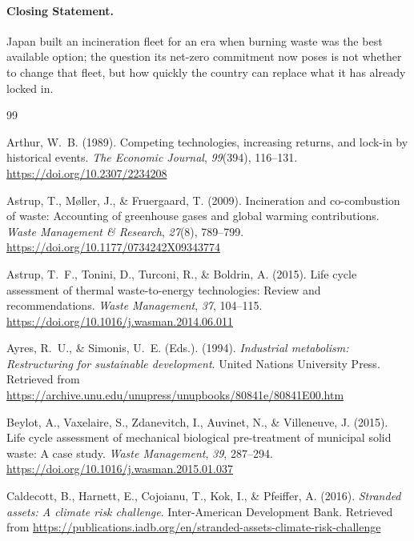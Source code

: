 \documentclass[12pt,a4paper]{article}
\begin{document}
\paragraph*{Closing Statement.}
Japan built an incineration fleet for an era when burning waste was the best available option; the question its net-zero commitment now poses is not whether to change that fleet, but how quickly the country can replace what it has already locked in.


\clearpage

\begin{thebibliography}{99}

Arthur, W.~B. (1989).
Competing technologies, increasing returns, and lock-in by historical events.
\emph{The Economic Journal}, \emph{99}(394), 116--131.
\url{https://doi.org/10.2307/2234208}

Astrup, T., M{\o}ller, J., \& Fruergaard, T. (2009).
Incineration and co-combustion of waste: Accounting of greenhouse gases and global warming contributions.
\emph{Waste Management \& Research}, \emph{27}(8), 789--799.
\url{https://doi.org/10.1177/0734242X09343774}

Astrup, T.~F., Tonini, D., Turconi, R., \& Boldrin, A. (2015).
Life cycle assessment of thermal waste-to-energy technologies: Review and recommendations.
\emph{Waste Management}, \emph{37}, 104--115.
\url{https://doi.org/10.1016/j.wasman.2014.06.011}

Ayres, R.~U., \& Simonis, U.~E. (Eds.). (1994).
\emph{Industrial metabolism: Restructuring for sustainable development}.
United Nations University Press.
Retrieved from \url{https://archive.unu.edu/unupress/unupbooks/80841e/80841E00.htm}

Beylot, A., Vaxelaire, S., Zdanevitch, I., Auvinet, N., \& Villeneuve, J. (2015).
Life cycle assessment of mechanical biological pre-treatment of municipal solid waste: A case study.
\emph{Waste Management}, \emph{39}, 287--294.
\url{https://doi.org/10.1016/j.wasman.2015.01.037}

Caldecott, B., Harnett, E., Cojoianu, T., Kok, I., \& Pfeiffer, A. (2016).
\emph{Stranded assets: A climate risk challenge}.
Inter-American Development Bank.
Retrieved from \url{https://publications.iadb.org/en/stranded-assets-climate-risk-challenge}


\end{thebibliography}
\end{document}
